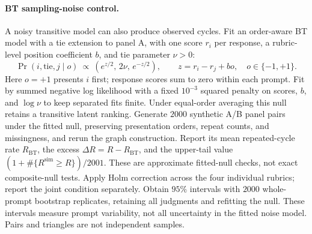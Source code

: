 \documentclass{article}
\theoremstyle{remark}
\theoremstyle{plain}
\begin{document}
\paragraph{BT sampling-noise control.}
A noisy transitive model can also produce observed cycles. Fit an order-aware BT model with a tie extension to panel A, with one score $r_i$ per response, a rubric-level position coefficient $b$, and tie parameter $\nu>0$:
\begin{equation}
\Pr(i,\mathrm{tie},j\mid o)
\ \propto\ \left(e^{z/2},\,2\nu,\,e^{-z/2}\right),
\qquad z=r_i-r_j+bo,\quad o\in\{-1,+1\}.
\label{eq:audit-bt-null}
\end{equation}
Here $o=+1$ presents $i$ first; response scores sum to zero within each prompt. Fit by summed negative log likelihood with a fixed $10^{-3}$ squared penalty on scores, $b$, and $\log\nu$ to keep separated fits finite. Under equal-order averaging this null retains a transitive latent ranking. Generate $2000$ synthetic A/B panel pairs under the fitted null, preserving presentation orders, repeat counts, and missingness, and rerun the graph construction. Report its mean repeated-cycle rate $R_{\mathrm{BT}}$, the excess $\Delta R=R-R_{\mathrm{BT}}$, and the upper-tail value $(1+\#\{R^{\mathrm{sim}}\ge R\})/2001$. These are approximate fitted-null checks, not exact composite-null tests. Apply Holm correction across the four individual rubrics; report the joint condition separately. Obtain $95\%$ intervals with $2000$ whole-prompt bootstrap replicates, retaining all judgments and refitting the null. These intervals measure prompt variability, not all uncertainty in the fitted noise model. Pairs and triangles are not independent samples.
\end{document}
